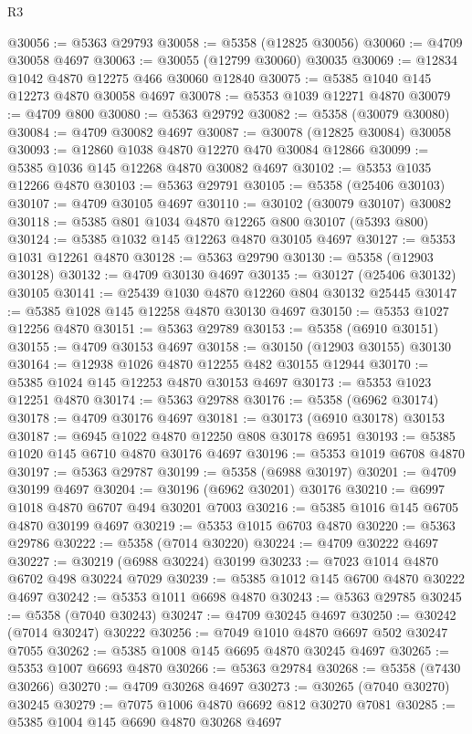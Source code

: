 \begin{lexlean}{R3}
\begin{coremodule}
@30056 := @5363 @29793
@30058 := @5358 (@12825 @30056)
@30060 := @4709 @30058 @4697
@30063 := @30055 (@12799 @30060) @30035
@30069 := @12834 @1042 @4870 @12275 @466 @30060 @12840
@30075 := @5385 @1040 @145 @12273 @4870 @30058 @4697
@30078 := @5353 @1039 @12271 @4870
@30079 := @4709 @800
@30080 := @5363 @29792
@30082 := @5358 (@30079 @30080)
@30084 := @4709 @30082 @4697
@30087 := @30078 (@12825 @30084) @30058
@30093 := @12860 @1038 @4870 @12270 @470 @30084 @12866
@30099 := @5385 @1036 @145 @12268 @4870 @30082 @4697
@30102 := @5353 @1035 @12266 @4870
@30103 := @5363 @29791
@30105 := @5358 (@25406 @30103)
@30107 := @4709 @30105 @4697
@30110 := @30102 (@30079 @30107) @30082
@30118 := @5385 @801 @1034 @4870 @12265 @800 @30107 (@5393 @800)
@30124 := @5385 @1032 @145 @12263 @4870 @30105 @4697
@30127 := @5353 @1031 @12261 @4870
@30128 := @5363 @29790
@30130 := @5358 (@12903 @30128)
@30132 := @4709 @30130 @4697
@30135 := @30127 (@25406 @30132) @30105
@30141 := @25439 @1030 @4870 @12260 @804 @30132 @25445
@30147 := @5385 @1028 @145 @12258 @4870 @30130 @4697
@30150 := @5353 @1027 @12256 @4870
@30151 := @5363 @29789
@30153 := @5358 (@6910 @30151)
@30155 := @4709 @30153 @4697
@30158 := @30150 (@12903 @30155) @30130
@30164 := @12938 @1026 @4870 @12255 @482 @30155 @12944
@30170 := @5385 @1024 @145 @12253 @4870 @30153 @4697
@30173 := @5353 @1023 @12251 @4870
@30174 := @5363 @29788
@30176 := @5358 (@6962 @30174)
@30178 := @4709 @30176 @4697
@30181 := @30173 (@6910 @30178) @30153
@30187 := @6945 @1022 @4870 @12250 @808 @30178 @6951
@30193 := @5385 @1020 @145 @6710 @4870 @30176 @4697
@30196 := @5353 @1019 @6708 @4870
@30197 := @5363 @29787
@30199 := @5358 (@6988 @30197)
@30201 := @4709 @30199 @4697
@30204 := @30196 (@6962 @30201) @30176
@30210 := @6997 @1018 @4870 @6707 @494 @30201 @7003
@30216 := @5385 @1016 @145 @6705 @4870 @30199 @4697
@30219 := @5353 @1015 @6703 @4870
@30220 := @5363 @29786
@30222 := @5358 (@7014 @30220)
@30224 := @4709 @30222 @4697
@30227 := @30219 (@6988 @30224) @30199
@30233 := @7023 @1014 @4870 @6702 @498 @30224 @7029
@30239 := @5385 @1012 @145 @6700 @4870 @30222 @4697
@30242 := @5353 @1011 @6698 @4870
@30243 := @5363 @29785
@30245 := @5358 (@7040 @30243)
@30247 := @4709 @30245 @4697
@30250 := @30242 (@7014 @30247) @30222
@30256 := @7049 @1010 @4870 @6697 @502 @30247 @7055
@30262 := @5385 @1008 @145 @6695 @4870 @30245 @4697
@30265 := @5353 @1007 @6693 @4870
@30266 := @5363 @29784
@30268 := @5358 (@7430 @30266)
@30270 := @4709 @30268 @4697
@30273 := @30265 (@7040 @30270) @30245
@30279 := @7075 @1006 @4870 @6692 @812 @30270 @7081
@30285 := @5385 @1004 @145 @6690 @4870 @30268 @4697

\end{coremodule}
\end{lexlean}
